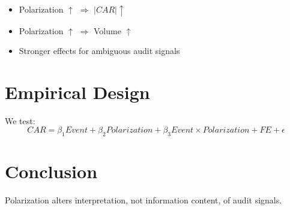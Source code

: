 \documentclass[12pt]{article}
\begin{document}
\begin{itemize}
\item Polarization $\uparrow$ $\Rightarrow$ $|CAR| \uparrow$
\item Polarization $\uparrow$ $\Rightarrow$ Volume $\uparrow$
\item Stronger effects for ambiguous audit signals
\end{itemize}

\section{Empirical Design}

We test:
\begin{equation}
CAR = \beta_1 Event + \beta_2 Polarization + \beta_3 Event \times Polarization + FE + \epsilon
\end{equation}

\section{Conclusion}
Polarization alters interpretation, not information content, of audit signals.



\end{document}
